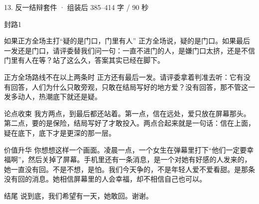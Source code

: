 \documentclass[script,con]{debate}
\begin{document}
\begin{kit}{13. 反一结辩}{套件 · 组装后 385–414 字 / 90 秒}
\begin{pick}{封路}{1}
\begin{module}{如果正方全场主打“疑的是门口，门里有人”}
正方全场说，疑的是门口。如果最后一发还是门口，请评委替我们问一句：一直不进门的人，是嫌门口太挤，还是不信门里有人在等？站了这么久，答案其实已经在脚下。
\end{module}
\begin{fallback}{正方全场路线不在以上两条时}
正方还有最后一发。请评委拿着判准去听：它有没有回答，人们为什么只敢旁观，只敢在结局写好的地方爱？没有回答，那不管这一发多动人，热潮底下就还是疑。
\end{fallback}
\end{pick}
\begin{fixed}{论点收束}
我方两点，到最后都还站着。第一点，信在远处，爱只放在屏幕那头。第二点，要的是保险，结局写好了才敢投入。两点合起来就是一句话：信在上面，疑在底下，底下才是更深的那一层。
\end{fixed}
\begin{fixed}{价值升华}
你想想这样一个画面。凌晨一点，一个女生在弹幕里打下“他们一定要幸福啊”，然后关掉了屏幕。手机里还有一条消息，是一个对她有好感的人发来的，她一直没有回。不是不想，是怕。我们今天争的，不是年轻人爱不爱看甜。是那条没有回的消息。她相信屏幕里的人会幸福，却不相信自己也可以。
\end{fixed}
\begin{fixed}{结尾}
说到底，我们希望有一天，她敢回。谢谢。
\end{fixed}
\end{kit}
\begin{contingency}
\end{contingency}
\end{document}
